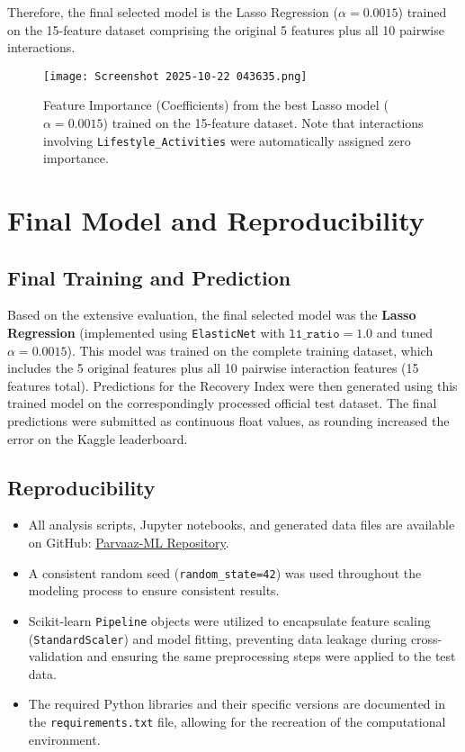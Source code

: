 \documentclass[12pt,a4paper]{article}
\begin{document}
Therefore, the final selected model is the Lasso Regression ($\alpha=0.0015$) trained on the 15-feature dataset comprising the original 5 features plus all 10 pairwise interactions.

\begin{figure}[htbp]
    \centering
    \texttt{[image: Screenshot 2025-10-22 043635.png]} 
    \caption{Feature Importance (Coefficients) from the best Lasso model ($\alpha=0.0015$) trained on the 15-feature dataset. Note that interactions involving \texttt{Lifestyle\_Activities} were automatically assigned zero importance.}
    \label{fig:feature_importance}
\end{figure}

\section{Final Model and Reproducibility}

\subsection{Final Training and Prediction}
Based on the extensive evaluation, the final selected model was the \textbf{Lasso Regression} (implemented using \texttt{ElasticNet} with $\texttt{l1\_ratio}=1.0$ and tuned $\alpha=0.0015$). This model was trained on the complete training dataset, which includes the 5 original features plus all 10 pairwise interaction features (15 features total). Predictions for the Recovery Index were then generated using this trained model on the correspondingly processed official test dataset. The final predictions were submitted as continuous float values, as rounding increased the error on the Kaggle leaderboard.

\subsection{Reproducibility}
\begin{itemize}
    \item All analysis scripts, Jupyter notebooks, and generated data files are available on GitHub: \href{https://github.com/Lmaowtfh4rsh/Parvaaz-ML}{Parvaaz-ML Repository}.
    \item A consistent random seed (\texttt{random\_state=42}) was used throughout the modeling process to ensure consistent results.
    \item Scikit-learn \texttt{Pipeline} objects were utilized to encapsulate feature scaling (\texttt{StandardScaler}) and model fitting, preventing data leakage during cross-validation and ensuring the same preprocessing steps were applied to the test data.
    \item The required Python libraries and their specific versions are documented in the \texttt{requirements.txt} file, allowing for the recreation of the computational environment.
\end{itemize}
\end{document}
